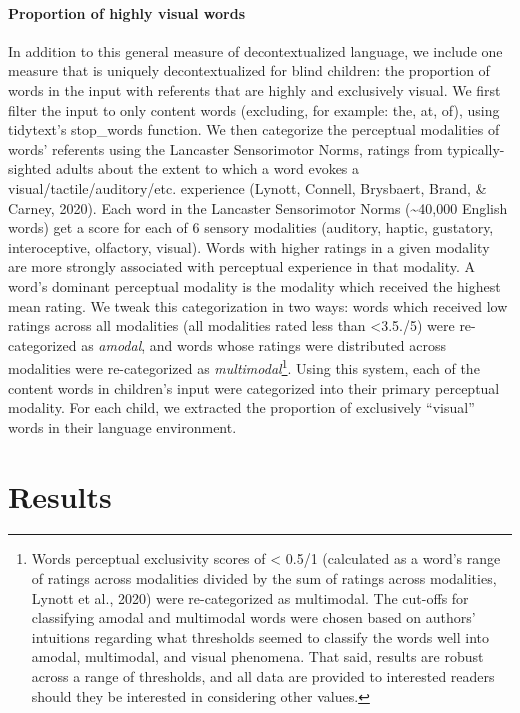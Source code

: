 \documentclass[
  man]{apa6}
\let\oldparagraph\paragraph
\renewcommand{\paragraph}[1]{\oldparagraph{#1}\mbox{}}
\begin{document}
\hypertarget{proportion-of-highly-visual-words}{%
\paragraph{Proportion of highly visual words}\label{proportion-of-highly-visual-words}}

In addition to this general measure of decontextualized language, we include one measure that is uniquely decontextualized for blind children: the proportion of words in the input with referents that are highly and exclusively visual. We first filter the input to only content words (excluding, for example: the, at, of), using tidytext's stop\_words function. We then categorize the perceptual modalities of words' referents using the Lancaster Sensorimotor Norms, ratings from typically-sighted adults about the extent to which a word evokes a visual/tactile/auditory/etc. experience (Lynott, Connell, Brysbaert, Brand, \& Carney, 2020). Each word in the Lancaster Sensorimotor Norms
(\textasciitilde40,000 English words) get a score for each of 6 sensory modalities (auditory, haptic, gustatory, interoceptive, olfactory, visual). Words with higher ratings in a given modality are more strongly associated with perceptual experience in that modality. A word's dominant perceptual modality is the modality which received the highest mean rating. We tweak this categorization in two ways: words which received low ratings across all modalities (all modalities rated less than \textless3.5./5) were re-categorized as \emph{amodal}, and words whose ratings were distributed across modalities were re-categorized as \emph{multimodal}\footnote{Words perceptual exclusivity scores of \textless{} 0.5/1 (calculated as a word's range of ratings across modalities divided by the sum of ratings across modalities, Lynott et al., 2020) were re-categorized as multimodal. The cut-offs for classifying amodal and multimodal words were chosen based on authors' intuitions regarding what thresholds seemed to classify the words well into amodal, multimodal, and visual phenomena. That said, results are robust across a range of thresholds, and all data are provided to interested readers should they be interested in considering other values.}. Using this system, each of the content words in children's input were categorized into their primary perceptual modality. For each child, we extracted the proportion of exclusively ``visual'' words in their language environment.

\hypertarget{results}{%
\section{Results}\label{results}}
\end{document}
